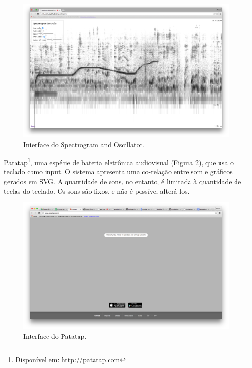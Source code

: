 \begin{figure}[ht]
    \caption{\label{spectrogramosc}Interface do Spectrogram and Oscillator.}
    \begin{center}
        \includegraphics[width=1\linewidth]{pictures/cap2/spectrogramandoscilator}
    \end{center}
\end{figure}

Patatap\footnote{Disponível em: \url{http://patatap.com}}, uma espécie de bateria eletrônica audiovisual (Figura \ref{patatap}), que usa o teclado como input. O sistema apresenta uma co-relação entre som e gráficos gerados em SVG. A quantidade de sons, no entanto, é limitada à quantidade de teclas do teclado. Os sons são fixos, e não é possível alterá-los.

\begin{figure}[ht]
    \caption{\label{patatap}Interface do Patatap.}
    \begin{center}
        \includegraphics[width=1\linewidth]{pictures/cap2/patatap}
    \end{center}
\end{figure}

